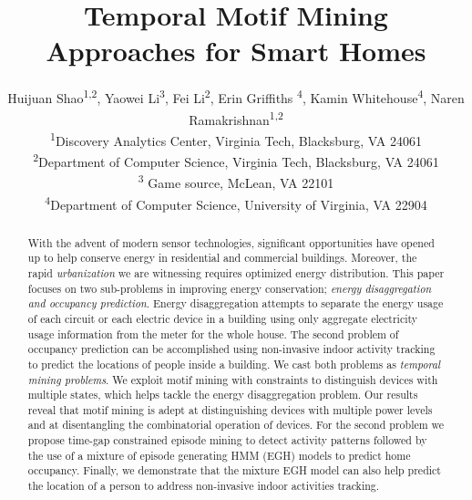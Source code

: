 \documentclass[sigconf]{acmart}
\begin{document}
\title{Temporal Motif Mining Approaches for Smart Homes}

\author{
  Huijuan Shao\textsuperscript{1,2}, Yaowei Li\textsuperscript{3}, Fei Li\textsuperscript{2}, Erin Griffiths \textsuperscript{4}, Kamin Whitehouse\textsuperscript{4}, Naren Ramakrishnan\textsuperscript{1,2} \\
  \textsuperscript{1}Discovery Analytics Center, Virginia Tech, Blacksburg, VA 24061 \\ %
  \textsuperscript{2}Department of Computer Science, Virginia Tech, Blacksburg, VA 24061 \\ %
    \textsuperscript{3} Game source, McLean, VA 22101 \\
  \textsuperscript{4}Department of Computer Science, University of Virginia, VA 22904 \\ %
}




\renewcommand{\shortauthors}{B. Trovato et al.}


\begin{abstract}
With the advent of modern sensor technologies, 
significant opportunities have opened up to help conserve energy in 
residential and commercial buildings. Moreover, the rapid \emph{urbanization} we are witnessing requires optimized energy distribution. 
This paper focuses on two sub-problems in improving energy conservation; \emph{energy disaggregation and occupancy prediction}. 
Energy disaggregation attempts to 
separate the energy usage 
of each circuit or each electric device in a building 
using only aggregate electricity usage information from 
the meter for the whole house. 
The second problem of occupancy prediction can be accomplished using non-invasive indoor activity tracking to 
predict the locations of people inside a building. 
We cast both problems as \emph{temporal mining problems}. We exploit motif mining with constraints to distinguish devices with multiple states, which helps tackle the energy disaggregation problem. Our
results reveal that motif mining is adept at distinguishing
devices with multiple power levels and at disentangling the
combinatorial operation of devices.
For the second problem we propose time-gap constrained episode mining to detect 
activity patterns followed by the use of a mixture of episode generating HMM (EGH) models 
to predict home occupancy.  
Finally, we demonstrate that the mixture EGH
model can also help predict the location of a person to 
address non-invasive indoor activities tracking. 
\end{abstract}
\end{document}
